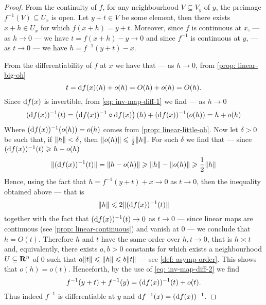 \begin{proof}
    From the continuity of \(f\), for any neighbourhood \(V \subseteq V_y\) of
    \(y\), the preimage \(f^{-1}(V) \subseteq U_x\) is open. Let \(y + t \in V\)
    be some element, then there exists \(x + h \in U_x\) for which \(f(x + h) = y
    + t\). Moreover, since \(f\) is continuous at \(x\), --- as \(h \to 0\) --- we
    have \(t = f(x + h) - y \to 0\) and since \(f^{-1}\) is continuous at \(y\),
    --- as \(t \to 0\) --- we have \(h = f^{-1}(y + t) - x\).

    From the differentiability of \(f\) at \(x\) we have that --- as \(h \to 0\),
    from \cref{prop: linear-big-oh}
    \begin{equation}\label{eq: inv-map-diff-1}
        t = \mathrm{d} f(x)(h) + o(h) = O(h) + o(h) = O(h).
    \end{equation}
    Since \(\mathrm{d} f(x)\) is invertible, from \cref{eq: inv-map-diff-1} we find
    --- as \(h \to 0\)
    \begin{align}\label{eq: inv-map-diff-2}
        (\mathrm{d} f(x))^{-1}(t) = \left( \mathrm{d} f(x))^{-1} \circ \mathrm{d} f(x) \right)(h) +
        (\mathrm{d} f(x))^{-1}(o(h))
        = h + o(h)
    \end{align}
    Where \((\mathrm{d} f(x))^{-1}(o(h)) = o(h)\) comes from \cref{prop:
        linear-little-oh}. Now let \(\delta > 0\) be such that, if \(\lVert h\rVert <
    \delta\), then \(\lVert o(h)\rVert \leqslant \frac 1 2 \lVert h\rVert\). For such
    \(\delta\) we find that --- since \((\mathrm{d} f(x))^{-1}(t) \geqslant h - o(h)\)
    \begin{align*}
        \lVert(\mathrm{d} f(x))^{-1}(t)\rVert
        = \lVert h - o(h)\rVert
        \geqslant \lVert h\rVert - \lVert o(h)\rVert
        \geqslant \frac 1 2 \lVert h\rVert
    \end{align*}
    Hence, using the fact that \(h = f^{-1}(y + t) + x \to 0\) as \(t \to 0\),
    then the inequality obtained above --- that is
    \[
        \lVert h\rVert \leqslant 2 \lVert(\mathrm{d} f(x))^{-1}(t)\rVert
    \]
    together with the fact that \((\mathrm{d} f(x))^{-1}(t) \to 0\) as \(t \to 0\) ---
    since linear maps are continuous (see \cref{prop: linear-continuous}) and
    vanish at \(0\) --- we conclude that \(h = O(t)\). Therefore \(h\) and \(t\)
    have the same order over \(h, t \to 0\), that is \(h \asymp t\) and,
    equivalently, there exists \(a, b > 0\) constants for which exists a
    neighbourhood \(U \subseteq \mathbf{R}^n\) of \(0\) such that \(a \lVert t\rVert \leqslant
    \lVert h\rVert \leqslant b \lVert t\rVert\) --- see \cref{def: asymp-order}. This
    shows that \(o(h) = o(t)\). Henceforth, by the use of \cref{eq:
        inv-map-diff-2} we find
    \[
        f^{-1}(y + t) + f^{-1}(y) = (\mathrm{d} f(x))^{-1}(t) + o(t).
    \]
    Thus indeed \(f^{-1}\) is differentiable at \(y\) and \(\mathrm{d} f^{-1}(x) =
    (\mathrm{d} f(x))^{-1}\).
\end{proof}

